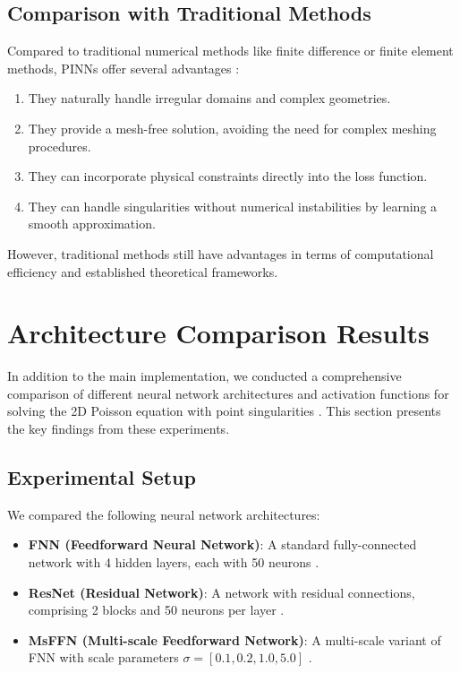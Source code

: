 \documentclass[12pt,a4paper]{report}
\begin{document}
	\section{Comparison with Traditional Methods}
	Compared to traditional numerical methods like finite difference or finite element methods, PINNs offer several advantages \cite{kharazmi2021hp, gao2021phygeonet}:
	\begin{enumerate}
		\item They naturally handle irregular domains and complex geometries.
		\item They provide a mesh-free solution, avoiding the need for complex meshing procedures.
		\item They can incorporate physical constraints directly into the loss function.
		\item They can handle singularities without numerical instabilities by learning a smooth approximation.
	\end{enumerate}
	
	However, traditional methods still have advantages in terms of computational efficiency and established theoretical frameworks.
	\chapter{Architecture Comparison Results}
	\label{sec:architecture_comparison}
	
	In addition to the main implementation, we conducted a comprehensive comparison of different neural network architectures and activation functions for solving the 2D Poisson equation with point singularities \cite{chen2020comparison}. This section presents the key findings from these experiments.
	
	\section{Experimental Setup}
	
	We compared the following neural network architectures:
	\begin{itemize}
		\item \textbf{FNN (Feedforward Neural Network)}: A standard fully-connected network with 4 hidden layers, each with 50 neurons \cite{goodfellow2016deep}.
		\item \textbf{ResNet (Residual Network)}: A network with residual connections, comprising 2 blocks and 50 neurons per layer \cite{jagtap2020adaptive}.
		\item \textbf{MsFFN (Multi-scale Feedforward Network)}: A multi-scale variant of FNN with scale parameters $\sigma = [0.1, 0.2, 1.0, 5.0]$ \cite{kharazmi2021hp}.
	\end{itemize}
	
\end{document}
